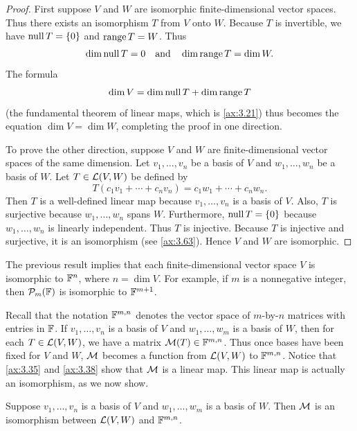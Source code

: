 \begin{proof}
First suppose $V$ and $W$ are isomorphic finite-dimensional vector spaces. Thus
there exists an isomorphism $T$ from $V$ onto $W$. Because $T$ is invertible,
we have $\operatorname{null} T=\{0\}$ and $\operatorname{range} T=W$. Thus
\[ \operatorname{dim}\operatorname{null} T = 0 \quad\text{and}\quad \operatorname{dim}\operatorname{range} T = \operatorname{dim} W. \]
The formula
\[ \operatorname{dim} V = \operatorname{dim}\operatorname{null} T+\operatorname{dim}\operatorname{range} T \]
(the fundamental theorem of linear maps, which is \ref{ax:3.21}) thus becomes
the equation $\dim V=\dim W$, completing the proof in one direction.

To prove the other direction, suppose $V$ and $W$ are finite-dimensional vector
spaces of the same dimension. Let $v_1,\dots,v_n$ be a basis of $V$ and
$w_1,\dots,w_n$ be a basis of $W$. Let $T\in\mathcal{L}(V,W)$ be defined by
\[ T(c_1v_1+\cdots+c_nv_n) = c_1w_1+\cdots+c_nw_n. \]
Then $T$ is a well-defined linear map because $v_1,\dots,v_n$ is a basis of
$V$. Also, $T$ is surjective because $w_1,\dots,w_n$ spans $W$. Furthermore,
$\operatorname{null} T=\{0\}$ because $w_1,\dots,w_n$ is linearly independent. Thus $T$ is
injective. Because $T$ is injective and surjective, it is an isomorphism (see
\ref{ax:3.63}). Hence $V$ and $W$ are isomorphic.
\end{proof}

%
The previous result implies that each finite-dimensional vector space $V$ is
isomorphic to $\mathbb{F}^n$, where $n=\dim V$. For example, if $m$ is a nonnegative
integer, then $\mathcal{P}_m(\mathbb{F})$ is isomorphic to $\mathbb{F}^{m+1}$.

Recall that the notation $\mathbb{F}^{m,n}$ denotes the vector space of $m$-by-$n$
matrices with entries in $\mathbb{F}$. If $v_1,\dots,v_n$ is a basis of $V$ and
$w_1,\dots,w_m$ is a basis of $W$, then for each $T\in\mathcal{L}(V,W)$, we have a
matrix $\mathcal{M}(T)\in\mathbb{F}^{m,n}$. Thus once bases have been fixed for $V$ and $W$,
$\mathcal{M}$ becomes a function from $\mathcal{L}(V,W)$ to $\mathbb{F}^{m,n}$. Notice that
\ref{ax:3.35} and \ref{ax:3.38} show that $\mathcal{M}$ is a linear map. This linear
map is actually an isomorphism, as we now show.

\begin{result}\label{ax:3.71}
Suppose $v_1,\dots,v_n$ is a basis of $V$ and $w_1,\dots,w_m$ is a basis of
$W$. Then $\mathcal{M}$ is an isomorphism between $\mathcal{L}(V,W)$ and $\mathbb{F}^{m,n}$.
\end{result}

